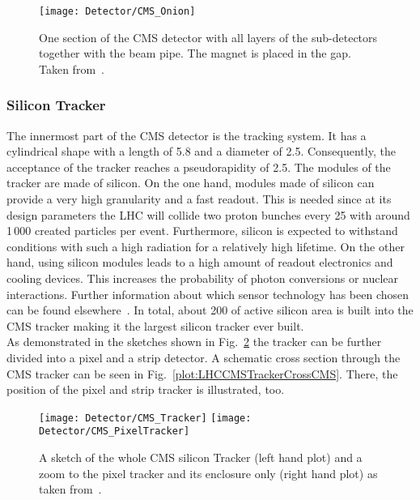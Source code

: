 \begin{figure}[Htb]
  \centering
  \texttt{[image: Detector/CMS\_Onion]}
  \caption[One section of the CMS detector with all layers]{One section of the CMS detector with all layers of the sub-detectors together with the beam pipe. The magnet is placed in the gap. Taken from~. \label{plot:LHCCMSOnionCMS}}
\end{figure}

\subsubsection{Silicon Tracker}

The innermost part of the CMS detector is the tracking system. It has a cylindrical shape with a length of 5.8\m{} and a diameter of 2.5\m{}. Consequently, the acceptance of the tracker reaches a pseudorapidity of 2.5. The modules of the tracker are made of silicon. On the one hand, modules made of silicon can provide a very high granularity and a fast readout. This is needed since at its design parameters the LHC will collide two proton bunches every 25\ns{} with around 1\,000 created particles per event. Furthermore, silicon is expected to withstand conditions with such a high radiation for a relatively high lifetime. On the other hand, using silicon modules leads to a high amount of readout electronics and cooling devices. This increases the probability of photon conversions or nuclear interactions. Further information about which sensor technology has been chosen can be found elsewhere~\cite{Chatrchyan:1129810}. In total, about 200\ms{} of active silicon area is built into the CMS tracker making it the largest silicon tracker ever built.\\
As demonstrated in the sketches shown in Fig.~\ref{plot:LHCCMSTrackerCMS} the tracker can be further divided into a pixel and a strip detector. A schematic cross section through the CMS tracker can be seen in Fig.~\ref{plot:LHCCMSTrackerCrossCMS}. There, the position of the pixel and strip tracker is illustrated, too.

\begin{figure}[Htb]
    \centering
    \texttt{[image: Detector/CMS\_Tracker]}
    \texttt{[image: Detector/CMS\_PixelTracker]}
    \caption[Sketches of the CMS Tracker]{A sketch of the whole CMS silicon Tracker (left hand plot) and a zoom to the pixel tracker and its enclosure only (right hand plot) as taken from~. \label{plot:LHCCMSTrackerCMS}}
\end{figure}


